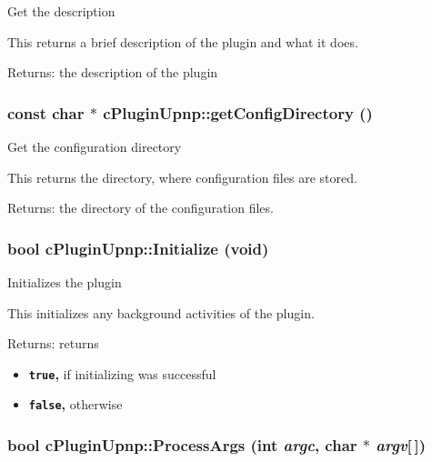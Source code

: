 Get the description

This returns a brief description of the plugin and what it does.

\begin{Desc}
\item[Returns:]the description of the plugin \end{Desc}
\hypertarget{classcPluginUpnp_ac2101984519b848cc04370b5527c145}{
\subsubsection[{getConfigDirectory}]{\setlength{\rightskip}{0pt plus 5cm}const char $\ast$ cPluginUpnp::getConfigDirectory ()}}
\label{classcPluginUpnp_ac2101984519b848cc04370b5527c145}


Get the configuration directory

This returns the directory, where configuration files are stored.

\begin{Desc}
\item[Returns:]the directory of the configuration files. \end{Desc}
\hypertarget{classcPluginUpnp_3f3daf1d0cd8d176cf1a349b9de10df7}{
\subsubsection[{Initialize}]{\setlength{\rightskip}{0pt plus 5cm}bool cPluginUpnp::Initialize (void)}}
\label{classcPluginUpnp_3f3daf1d0cd8d176cf1a349b9de10df7}


Initializes the plugin

This initializes any background activities of the plugin.

\begin{Desc}
\item[Returns:]returns\begin{itemize}
\item {\bf {\tt true},} if initializing was successful\item {\bf {\tt false},} otherwise \end{itemize}
\end{Desc}
\hypertarget{classcPluginUpnp_acbc8a8b3f67d08ed20ff1c8beaa4fe2}{
\subsubsection[{ProcessArgs}]{\setlength{\rightskip}{0pt plus 5cm}bool cPluginUpnp::ProcessArgs (int {\em argc}, \/  char $\ast$ {\em argv}\mbox{[}$\,$\mbox{]})}}
\label{classcPluginUpnp_acbc8a8b3f67d08ed20ff1c8beaa4fe2}


